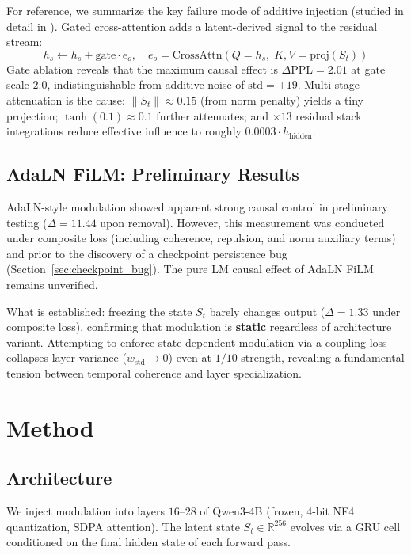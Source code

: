 \documentclass[11pt,a4paper]{article}
\newcommand{\R}{\mathbb{R}}
\newcommand{\St}{S_t}
\begin{document}
For reference, we summarize the key failure mode of additive injection (studied in
detail in \cite{plaa1}). Gated cross-attention adds a latent-derived signal to the
residual stream:
$$h_s \leftarrow h_s + \mathrm{gate} \cdot e_o, \quad e_o = \mathrm{CrossAttn}(Q{=}h_s,\; K,V{=}\mathrm{proj}(\St))$$
Gate ablation reveals that the maximum causal effect is $\Delta\mathrm{PPL} = 2.01$
at gate scale $2.0$, indistinguishable from additive noise of $\mathrm{std} = \pm 19$.
Multi-stage attenuation is the cause: $\|\St\| \approx 0.15$ (from norm penalty)
yields a tiny projection; $\tanh(0.1) \approx 0.1$ further attenuates; and
$\times 13$ residual stack integrations reduce effective influence to roughly
$0.0003 \cdot h_{\mathrm{hidden}}$.

\subsection{AdaLN FiLM: Preliminary Results}

AdaLN-style modulation \cite{perez2018film, peebles2023scalable} showed apparent
strong causal control in preliminary testing ($\Delta = 11.44$ upon removal).
However, this measurement was conducted under composite loss (including coherence,
repulsion, and norm auxiliary terms) and prior to the discovery of a checkpoint
persistence bug (Section~\ref{sec:checkpoint_bug}). The pure LM causal effect of
AdaLN FiLM remains unverified.

What is established: freezing the state $\St$ barely changes output ($\Delta = 1.33$
under composite loss), confirming that modulation is \textbf{static} regardless of
architecture variant. Attempting to enforce state-dependent modulation via a coupling
loss collapses layer variance ($w_{\mathrm{std}} \to 0$) even at $1/10$ strength,
revealing a fundamental tension between temporal coherence and layer specialization.

\section{Method}

\subsection{Architecture}

We inject modulation into layers $16$--$28$ of Qwen3-4B (frozen, 4-bit NF4
quantization, SDPA attention). The latent state $\St \in \R^{256}$ evolves via a GRU
cell conditioned on the final hidden state of each forward pass.
\end{document}
